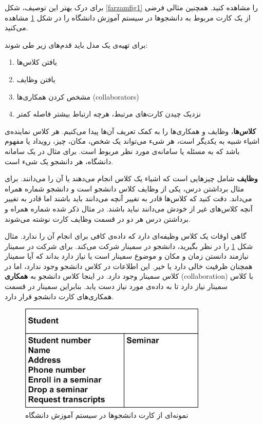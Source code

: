 {برای درک بهتر این توصیف، شکل \ref{farzamfig1} را مشاهده کنید.
همچنین مثالی فرضی از یک کارت
مربوط به دانشجو‌ها در سیستم آموزش دانشگاه را در شکل \ref{farzamfig2} مشاهده می‌کنید.

\newpage

برای تهیه‌ی یک مدل
باید قدم‌های زیر طی شوند:

\begin{enumerate}
	\item یافتن کلاس‌ها
	\item یافتن وظایف
	\item  مشخص کردن همکاری‌ها (collaborators)
	\item نزدیک‌ چیدن کارت‌های مرتبط، هرچه ارتباط بیشتر فاصله کمتر
\end{enumerate}

\textbf{کلاس‌ها}، وظایف و همکاری‌ها را به کمک تعریف آن‌ها پیدا می‌کنیم.
هر کلاس نماینده‌ی اشیاء شبیه به یکدیگر است، هر شی‌ء می‌تواند یک شخص، مکان، چیز، رویداد یا مفهوم باشد که به مسئله یا سامانه‌ی مورد نظر مربوط است. برای مثال در یک سامانه دانشگاه، هر دانشجو یک شیء است.

\textbf{وظایف} شامل چیز‌هایی است که اشیاء یک کلاس انجام می‌دهند یا آن را می‌دانند. برای مثال برداشتن درس، یکی از وظایف کلاس دانشجو است و دانشجو شماره همراه می‌داند. دقت کنید که کلاس‌ها قادر به تغییر آنچه می‌دانند باید باشند اما قادر به تغییر آنچه کلاس‌های غیر از خودش می‌دانند نباید باشند. در مثال ذکر شده شماره همراه و برداشتن درس هر دو در قسمت وظایف کارت 
نوشته می‌شوند.

گاهی اوقات یک کلاس وظیفه‌ای دارد که داده‌ی کافی برای انجام آن را ندارد. مثال شکل \ref{farzamfig2} را در نظر بگیرید، دانشجو در سمینار شرکت می‌کند. برای شرکت در سمینار نیازمند دانستن زمان و مکان و موضوع سمینار است یا نیاز دارد بداند که آیا سمینار همچنان ظرفیت خالی دارد یا خیر. این اطلاعات در کلاس دانشجو وجود ندارد، اما در کلاس سمینار وجود دارد. در اینجا کلاس دانشجو به \textbf{همکاری} (collaboration) با کلاس سمینار نیاز دارد تا به داده‌ی مورد نیاز دست یابد. بنابراین سمینار در قسمت همکاری‌های کارت
دانشجو قرار دارد.



\begin{figure}
	\centering
	\includegraphics[scale=1.0]{figs/Q5/2.jpg}
	\caption{نمونه‌ای از کارت
		دانشجو‌ها در سیستم آموزش دانشگاه
		\cite{ambler}
	}	
	\label{farzamfig2}
\end{figure}


}
